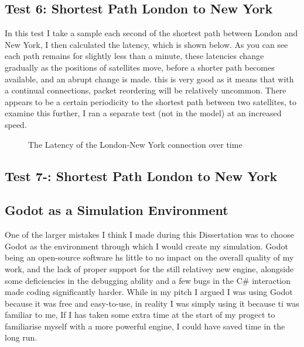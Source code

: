 \documentclass[12pt]{article}
\begin{document}
\subsection{Test 6: Shortest Path London to New York}

In this test I take a sample each second of the shortest path between London and New York, I then calculated the latency, which is shown below. As you can see each path remains for slightly less than a minute, these latencies change gradually as the positions of satellites move, before a shorter path becomes available, and an abrupt change is made. this is very good as it means that with a continual connections, packet reordering will be relatively uncommon. There appears to be a certain periodicity to the shortest path between two satellites, to examine this further, I ran a separate test (not in the model) at an increased speed.

\begin{figure}
\label{fig:Latency London To New York}
\caption{The Latency of the London-New York connection over time}
\end{figure}

\subsection{Test 7-: Shortest Path London to New York}



\subsection{Godot as a Simulation Environment}

One of the larger mistakes I think I made during this Dissertation was to choose Godot as the environment through which I would create my simulation. Godot being an open-source software hs little to no impact on the overall quality of my work, and the lack of proper support for the still relativey new engine, alongside some deficiencies in the debugging ability and a few bugs in the C\# interaction made coding significantly harder. While in my pitch I argued I was using Godot because it was free and easy-to-use, in reality I was simply using it because ti was familiar to me, If I has taken some extra time at the start of my progect to familiarise myself with a more powerful engine, I could have saved time in the long run.
\end{document}
